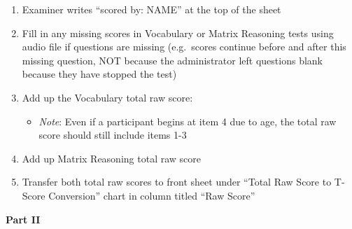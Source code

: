 \documentclass[]{book}
\providecommand{\tightlist}{%
  \setlength{\itemsep}{0pt}\setlength{\parskip}{0pt}}
\begin{document}
\begin{enumerate}
\def\labelenumi{\arabic{enumi}.}
\tightlist
\item
  Examiner writes ``scored by: NAME'' at the top of the sheet
\item
  Fill in any missing scores in Vocabulary or Matrix Reasoning tests using audio file if questions are missing (e.g.~scores continue before and after this missing question, NOT because the administrator left questions blank because they have stopped the test)
\item
  Add up the Vocabulary total raw score:

  \begin{itemize}
  \tightlist
  \item
    \emph{Note}: Even if a participant begins at item 4 due to age, the total raw score should still include items 1-3
  \end{itemize}
\item
  Add up Matrix Reasoning total raw score
\item
  Transfer both total raw scores to front sheet under ``Total Raw Score to T-Score Conversion'' chart in column titled ``Raw Score''
\end{enumerate}

\textbf{Part II}
\end{document}
